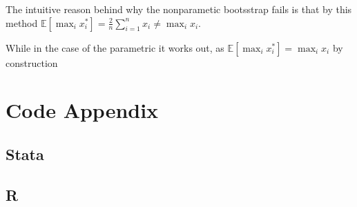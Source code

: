 \documentclass[12pt]{article}
\newcommand{\E}{\mathbb{E}}
\newcommand{\qsum}{\sum\limits_{i=1}^n}
\begin{document}
The intuitive reason behind why the nonparametic bootsstrap fails is that by this method $ \E[\max_i x^*_i] = \frac{2}{n}\qsum x_i \neq \max_i x_i$.

While in the case of the parametric it works out, as $ \E[\max_i x^*_i] = \max_i x_i$ by construction



\newpage
\section{Code Appendix}
\tiny
\subsection*{Stata}

\subsection*{R}



\end{document}
